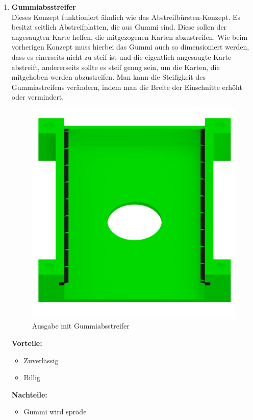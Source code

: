 \begin{enumerate}
    \item \textbf{Gummiabsstreifer}\\
    Dieses Konzept funktioniert ähnlich wie das Abstreifbürsten-Konzept.
    Es besitzt seitlich Abstreifplatten, die aus Gummi sind.
    Diese sollen der angesaugten Karte helfen, die mitgezogenen Karten abzustreifen.
    Wie beim vorherigen Konzept muss hierbei das Gummi auch so
    dimensioniert werden, dass es einerseits nicht zu steif ist und die eigentlich angesaugte Karte abstreift, andererseits sollte es steif genug sein, um die Karten, die mitgehoben werden abzustreifen.
    Man kann die Steifigkeit des Gummiastreifens verändern, indem man die Breite der Einschnitte
    erhöht oder vermindert.

    \begin{figure}[H]
        \centering
        \includegraphics[scale=0.4,page=1]{fig/mech/AsugabeMitGummiabstreifer.png}
        \caption{Ausgabe mit Gummiabsstreifer}
    \end{figure}

    \textbf{Vorteile:}
    \begin{itemize}
        \item Zuverlässig
        \item Billig
    \end{itemize}
    \textbf{Nachteile:}
    \begin{itemize}
        \item Gummi wird spröde
    \end{itemize}
\end{enumerate}

